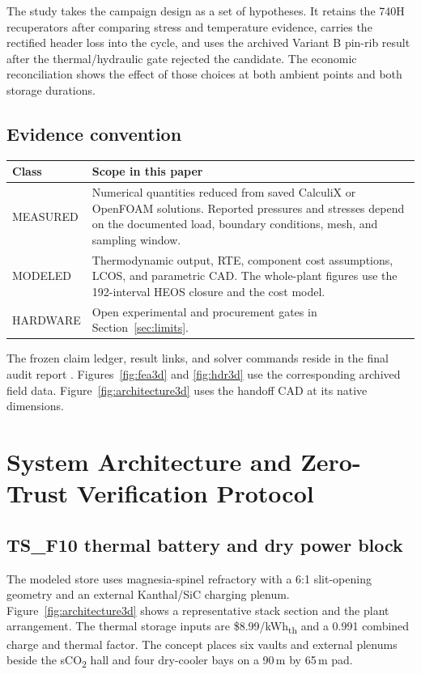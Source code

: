 \documentclass[10pt,a4paper]{article}
\begin{document}
The study takes the campaign design as a set of hypotheses. It retains the 740H recuperators after comparing stress and temperature evidence, carries the rectified header loss into the cycle, and uses the archived Variant B pin-rib result after the thermal/hydraulic gate rejected the candidate. The economic reconciliation shows the effect of those choices at both ambient points and both storage durations.

\subsection*{Evidence convention}
\begin{tabularx}{\linewidth}{@{}lX@{}}
\toprule
\textbf{Class} & \textbf{Scope in this paper}\\
\midrule
\textsf{MEASURED} & Numerical quantities reduced from saved CalculiX or OpenFOAM solutions. Reported pressures and stresses depend on the documented load, boundary conditions, mesh, and sampling window.\\
\textsf{MODELED} & Thermodynamic output, RTE, component cost assumptions, LCOS, and parametric CAD. The whole-plant figures use the 192-interval HEOS closure and the cost model.\\
\textsf{HARDWARE} & Open experimental and procurement gates in Section~\ref{sec:limits}.\\
\bottomrule
\end{tabularx}

\medskip
The frozen claim ledger, result links, and solver commands reside in the final audit report \cite{audit}. Figures~\ref{fig:fea3d} and \ref{fig:hdr3d} use the corresponding archived field data. Figure~\ref{fig:architecture3d} uses the handoff CAD at its native dimensions.

\clearpage
\section{System Architecture and Zero-Trust Verification Protocol}


\subsection{TS\_F10 thermal battery and dry power block}
The modeled store uses magnesia-spinel refractory with a 6:1 slit-opening geometry and an external Kanthal/SiC charging plenum. Figure~\ref{fig:architecture3d} shows a representative stack section and the plant arrangement. The thermal storage inputs are \$8.99/kWh\textsubscript{th} and a 0.991 combined charge and thermal factor. The concept places six vaults and external plenums beside the sCO\textsubscript{2} hall and four dry-cooler bays on a 90\,m by 65\,m pad.
\end{document}

